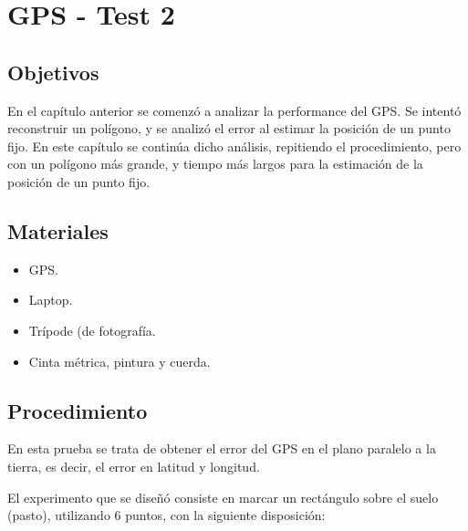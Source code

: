 \documentclass[spanish,12pt,a4paper,titlepage]{report}
\begin{document}
\chapter{GPS - Test 2}
\label{chap-gps-test-2}

\section{Objetivos}
\label{chap-gps-test-1}

En el capítulo anterior se comenzó a analizar la performance del GPS. Se intentó reconstruir un polígono, y se analizó el error al estimar la posición de un punto fijo. En este capítulo se continúa dicho análisis, repitiendo el procedimiento, pero con un polígono más grande, y tiempo más largos para la estimación de la posición de un punto fijo.

\section{Materiales}

\begin{itemize}
\item GPS.
\item Laptop.
\item Trípode (de fotografía.
\item Cinta métrica, pintura y cuerda.
\end{itemize}

\newpage
\section{Procedimiento}
\label{sec:gps2-procedimiento}

En esta prueba se trata de obtener el error del GPS en el plano paralelo a la tierra, es decir, el error en latitud y longitud.

El experimento que se diseñó consiste en marcar un rectángulo sobre el suelo (pasto), utilizando 6 puntos, con la siguiente disposición:
\end{document}
